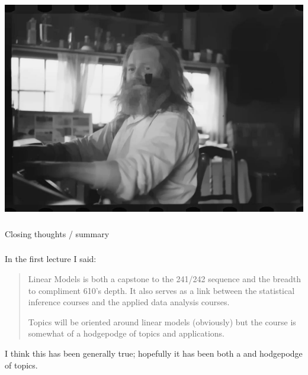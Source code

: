 \begin{frame}

\begin{center}
\includegraphics[width=\textwidth]{img/img3.jpg}
\end{center}

\end{frame}

\begin{frame}[fragile] \frametitle{}

\begin{flushright}
{\color{yaleblue}\sc\fontsize{1cm}{0cm}\selectfont Closing thoughts / summary}
\end{flushright}

\end{frame}

\begin{frame}[fragile] \frametitle{}

In the first lecture I said:
\begin{quote}
Linear Models is both a capstone to the 241/242 sequence
and the breadth to compliment 610's depth. It also
serves as a link between the statistical inference courses
and the applied data analysis courses.

\medskip

Topics will be oriented around linear models (obviously) but
the course is somewhat of a hodgepodge of topics and applications.
\end{quote}
I think this has been generally true; hopefully it has been both
a  and  hodgepodge of topics.

\end{frame}

